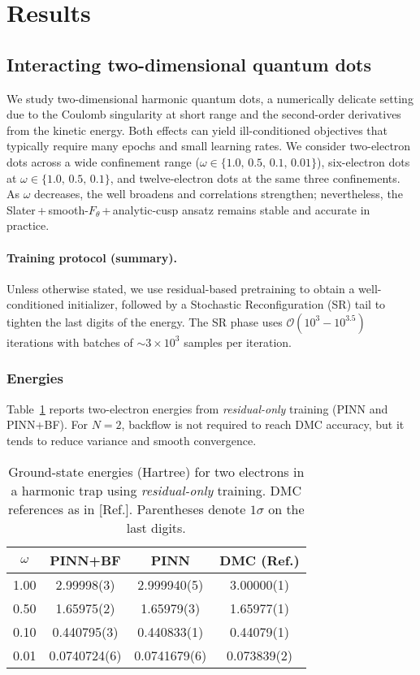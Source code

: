 
\section{Results}

\subsection{Interacting two-dimensional quantum dots}

We study two-dimensional harmonic quantum dots, a numerically delicate setting due to the Coulomb singularity at short range and the second-order derivatives from the kinetic energy. Both effects can yield ill-conditioned objectives that typically require many epochs and small learning rates. We consider two-electron dots across a wide confinement range ($\omega\!\in\!\{1.0,\,0.5,\,0.1,\,0.01\}$), six-electron dots at $\omega\!\in\!\{1.0,\,0.5,\,0.1\}$, and twelve-electron dots at the same three confinements. As $\omega$ decreases, the well broadens and correlations strengthen; nevertheless, the Slater\,+\,smooth-$F_\theta$\,+\,analytic-cusp ansatz remains stable and accurate in practice.

\paragraph{Training protocol (summary).}
Unless otherwise stated, we use residual-based pretraining to obtain a well-conditioned initializer, followed by a Stochastic Reconfiguration (SR) tail to tighten the last digits of the energy. The SR phase uses $\mathcal{O}(10^3\!-\!10^3.5)$ iterations with batches of $\sim\!3{\times}10^3$ samples per iteration.

\subsubsection{Energies}

Table~\ref{tab:Residual} reports two-electron energies from \emph{residual-only} training (PINN and PINN+BF). For $N{=}2$, backflow is not required to reach DMC accuracy, but it tends to reduce variance and smooth convergence.

\begin{table}[h!]
\centering
\caption{Ground-state energies (Hartree) for two electrons in a harmonic trap using \emph{residual-only} training. DMC references as in [Ref.]. Parentheses denote $1\sigma$ on the last digits.}
\label{tab:Residual}
\begin{tabular}{c c c c}
\hline
$\omega$ & PINN+BF & PINN & DMC (Ref.) \\
\hline
1.00  & 2.99998(3)   & 2.999940(5)  & 3.00000(1) \\
0.50  & 1.65975(2)   & 1.65979(3)   & 1.65977(1) \\
0.10  & 0.440795(3)  & 0.440833(1)  & 0.44079(1) \\
0.01  & 0.0740724(6) & 0.0741679(6) & 0.073839(2) \\
\hline
\end{tabular}
\end{table}

